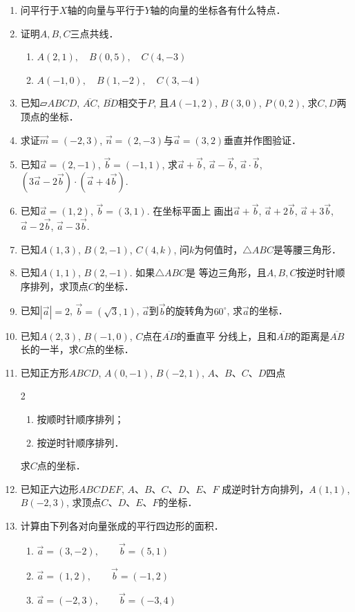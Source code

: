 \begin{enumerate}
\item 问平行于$X$轴的向量与平行于$Y$轴的向量的坐标各有什么特点．
\item 证明$A,B,C$三点共线．
\begin{enumerate}
    \item $A (2, 1) ,\quad  B (0, 5) ,\quad  C (4, -3)$
    \item $A (-1, 0) ,\quad  B (1, -2) ,\quad  C (3, -4)$
\end{enumerate}
\item 已知$\parallelogram{ABCD}$, $\overline{AC}$, $\overline{BD}$相交于$P$, 且$A(-1, 2)$, $B(3, 0)$, $P(0, 2)$, 求$C,D$两顶点的坐标．
\item 求证$\vec{m}=(-2, 3)$, $\vec{n}=(2,-3)$与$\vec{a}=(3, 2)$垂直并作图验证．
\item 已知$\vec{a}=(2,-1)$, $\vec{b}=(-1, 1)$, 求$\vec{a}+\vec{b}$, $\vec{a}-\vec{b}$, $\vec{a}\cdot \vec{b}$, 
$\left(3\vec{a}-2\vec{b}\right)\cdot\left(\vec{a}+4\vec{b}\right)$.
\item 已知$\vec{a}=(1, 2)$, $\vec{b}=(3, 1)$. 在坐标平面上
画出$\vec{a}+\vec{b}$, $\vec{a}+2\vec{b}$, $\vec{a}+3\vec{b}$, $\vec{a}-2\vec{b}$, $\vec{a}-3\vec{b}$.

\item 已知$A(1, 3)$, $B(2,-1)$, $C(4,k)$, 问$k$为何值时，$\triangle ABC$是等腰三角形．
\item 已知$A(1, 1)$, $B(2,-1)$. 如果$\triangle ABC$是
等边三角形，且$A,B,C$按逆时针顺序排列，求顶点$C$的坐标．
\item 已知$|\vec{a}| = 2$, $\vec{b}=(\sqrt{3}, 1)$, $\vec{a}$到$\vec{b}$的旋转角为$60^{\circ}$, 求$\vec{a}$的坐标．
\item 已知$A(2, 3)$, $B(-1, 0)$, $C$点在$\overline{AB}$的垂直平
分线上，且和$\overline{AB}$的距离是$\overline{AB}$长的一半，求$C$点的坐标．
\item 已知正方形$ABCD$, $A(0,-1)$, $B(-2, 1)$, 
$A$、$B$、$C$、$D$四点
\begin{multicols}{2}
\begin{enumerate}
    \item 按顺时针顺序排列；
    \item 按逆时针顺序排列．
\end{enumerate}
\end{multicols}
求$C$点的坐标．
\item 已知正六边形$ABCDEF$, $A$、$B$、$C$、$D$、$E$、$F$
成逆时针方向排列，$A(1, 1)$, $B(-2, 3)$, 求顶点$C$、$D$、$E$、$F$的坐标．
\item 计算由下列各对向量张成的平行四边形的面积．
\begin{enumerate}
    \item $\vec{a}= (3, -2) ,\qquad \vec{b}= (5, 1)$
    \item $\vec{a}= (1, 2) ,\qquad \vec{b}= (-1, 2) $
    \item $\vec{a}= (-2, 3) ,\qquad \vec{b}= (-3, 4) $
\end{enumerate}
\end{enumerate}

